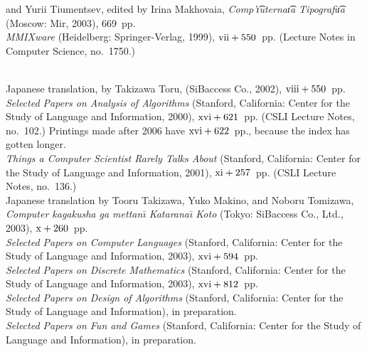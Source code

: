  and Yurii Tiumentsev, edited by Irina Makhovaia,
 {\sl Comp'{\t\i}uterna{\t\i}a Tipografi{\t\i}a\/} (Moscow: Mir, 2003), 669~pp.
\yyskip
\\{\sl MMIXware\/} (Heidelberg: Springer-Verlag, 1999),
 $\rm vii+550$~pp. (Lecture Notes in Computer Science, no.~1750.)\par
\yyskip
\\Japanese translation, by Takizawa Toru, (SiB\thinspace access Co., 2002),
 $\rm viii+550$~pp.
\yyskip
\\{\sl Selected Papers on Analysis of Algorithms\/} (Stanford, California:
 Center for the Study of Language and Information, 2000), $\rm xvi+621$~pp.
 (CSLI Lecture Notes, no.~102.) Printings made after 2006 have
 $\rm xvi+622$~pp., because the index has gotten longer.
\yyskip
\\{\sl Things a Computer Scientist Rarely Talks About\/} (Stanford, California:
 Center for the Study of Language and Information, 2001), $\rm xi+257$~pp.
 (CSLI Lecture Notes, no.~136.)
\\Japanese translation by Tooru Takizawa, Yuko Makino, and Noboru Tomizawa,
 {\sl Computer kagakusha ga mettan\={\i} Katarana\={\i} Koto\/}
 (Tokyo: SiBaccess Co., Ltd., 2003), $\rm x+260$~pp.
\yyskip
\\{\sl Selected Papers on Computer Languages\/} (Stanford, California:
 Center for the Study of Language and Information, 2003), $\rm xvi+594$~pp.
\yyskip
\\{\sl Selected Papers on Discrete Mathematics\/} (Stanford, California:
 Center for the Study of Language and Information, 2003), $\rm xvi+812$~pp.
\yyskip
\\{\sl Selected Papers on Design of Algorithms\/} (Stanford, California:
 Center for the Study of Language and Information), in preparation.
\yyskip
\\{\sl Selected Papers on Fun and Games\/} (Stanford, California:
 Center for the Study of Language and Information), in preparation.

